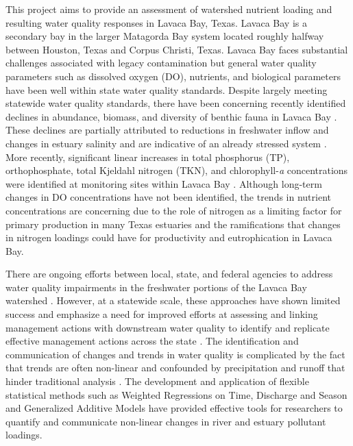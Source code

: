 \documentclass[sn-basic,referee,lineno,pdflatex]{sn-jnl}
\begin{document}
This project aims to provide an assessment of watershed nutrient loading
and resulting water quality responses in Lavaca Bay, Texas. Lavaca Bay
is a secondary bay in the larger Matagorda Bay system located roughly
halfway between Houston, Texas and Corpus Christi, Texas. Lavaca Bay
faces substantial challenges associated with legacy contamination but
general water quality parameters such as dissolved oxygen (DO),
nutrients, and biological parameters have been well within state water
quality standards. Despite largely meeting statewide water quality
standards, there have been concerning recently identified declines in
abundance, biomass, and diversity of benthic fauna in Lavaca Bay
\citep{beserespollackLongtermTrendsResponse2011}. These declines are
partially attributed to reductions in freshwater inflow and changes in
estuary salinity and are indicative of an already stressed system
\citep{beserespollackLongtermTrendsResponse2011, palmerImpactsDroughtsLow2015, montagnaAssessmentRelationshipFreshwater2020}.
More recently, significant linear increases in total phosphorus (TP),
orthophosphate, total Kjeldahl nitrogen (TKN), and chlorophyll-\emph{a}
concentrations were identified at monitoring sites within Lavaca Bay
\citep{bugica_water_2020}. Although long-term changes in DO
concentrations have not been identified, the trends in nutrient
concentrations are concerning due to the role of nitrogen as a limiting
factor for primary production in many Texas estuaries
\citep{gardnerNitrogenFixationDissimilatory2006, houTransformationFateNitrate2012, doradoUnderstandingInteractionsFreshwater2015, paudelRelationshipSuspendedSolids2019, wetz_exceptionally_2017}
and the ramifications that changes in nitrogen loadings could have for
productivity and eutrophication in Lavaca Bay.

There are ongoing efforts between local, state, and federal agencies to
address water quality impairments in the freshwater portions of the
Lavaca Bay watershed
\citep{jainTechnicalSupportDocument2021, schrammLavacaRiverWatershed2018, bertholdDirectMailingEducation2021}.
However, at a statewide scale, these approaches have shown limited
success and emphasize a need for improved efforts at assessing and
linking management actions with downstream water quality to identify and
replicate effective management actions across the state
\citep{schrammTotalMaximumDaily2022}. The identification and
communication of changes and trends in water quality is complicated by
the fact that trends are often non-linear and confounded by
precipitation and runoff that hinder traditional analysis
\citep{wazniakLinkingWaterQuality2007, lloydMethodsDetectingChange2014}.
The development and application of flexible statistical methods such as
Weighted Regressions on Time, Discharge and Season
\citep[WRTDS,][]{hirschWeightedRegressionsTime2010} and Generalized
Additive Models \citep[GAMs,][]{woodFastStableRestricted2011} have
provided effective tools for researchers to quantify and communicate
non-linear changes in river and estuary pollutant loadings.
\end{document}
